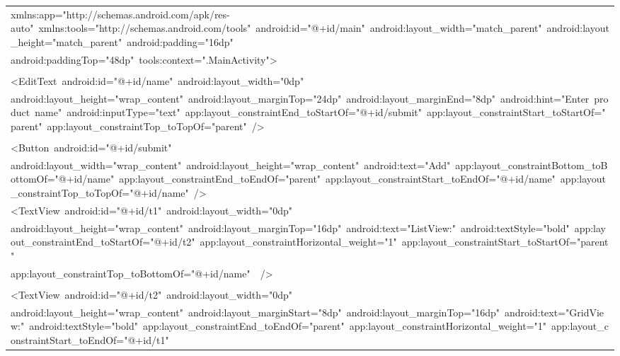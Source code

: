 \documentclass[a4paper,12pt]{article}
\begin{document}
\begin{longtable}{|p{}|}
{\ttfamily\small xmlns:app="http://schemas.android.com/apk/res-auto"\ xmlns:tools="http://schemas.android.com/tools"\ android:id="@+id/main"\ android:layout\_width="match\_parent"\ android:layout\_height="match\_parent"\ android:padding="16dp"} \\
{\ttfamily\small android:paddingTop="48dp"\ tools:context=".MainActivity"\textgreater{}} \\
\strut \\
{\ttfamily\small \textless{}EditText\ android:id="@+id/name"\ android:layout\_width="0dp"} \\
{\ttfamily\small android:layout\_height="wrap\_content"\ android:layout\_marginTop="24dp"\ android:layout\_marginEnd="8dp"\ android:hint="Enter\ product\ name"\ android:inputType="text"\ app:layout\_constraintEnd\_toStartOf="@+id/submit"\ app:layout\_constraintStart\_toStartOf="parent"\ app:layout\_constraintTop\_toTopOf="parent"\ /\textgreater{}} \\
\strut \\
{\ttfamily\small \textless{}Button\ android:id="@+id/submit"} \\
{\ttfamily\small android:layout\_width="wrap\_content"\ android:layout\_height="wrap\_content"\ android:text="Add"\ app:layout\_constraintBottom\_toBottomOf="@+id/name"\ app:layout\_constraintEnd\_toEndOf="parent"\ app:layout\_constraintStart\_toEndOf="@+id/name"\ app:layout\_constraintTop\_toTopOf="@+id/name"\ /\textgreater{}} \\
{\ttfamily\small \textless{}TextView\ android:id="@+id/t1"\ android:layout\_width="0dp"} \\
{\ttfamily\small android:layout\_height="wrap\_content"\ android:layout\_marginTop="16dp"\ android:text="ListView:"\ android:textStyle="bold"\ app:layout\_constraintEnd\_toStartOf="@+id/t2"\ app:layout\_constraintHorizontal\_weight="1"\ app:layout\_constraintStart\_toStartOf="parent"} \\
{\ttfamily\small app:layout\_constraintTop\_toBottomOf="@+id/name"\ \ /\textgreater{}} \\
\strut \\
{\ttfamily\small \textless{}TextView\ android:id="@+id/t2"\ android:layout\_width="0dp"} \\
{\ttfamily\small android:layout\_height="wrap\_content"\ android:layout\_marginStart="8dp"\ android:layout\_marginTop="16dp"\ android:text="GridView:"\ android:textStyle="bold"\ app:layout\_constraintEnd\_toEndOf="parent"\ app:layout\_constraintHorizontal\_weight="1"\ app:layout\_constraintStart\_toEndOf="@+id/t1"} \\

\end{longtable}
\end{document}

